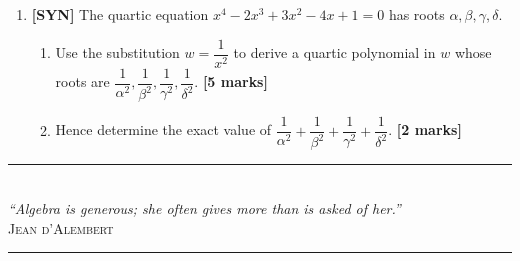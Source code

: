 \documentclass[11pt,a4paper]{article}
\begin{document}
\begin{enumerate}[resume]
\item \textbf{[SYN]} The quartic equation $x^4 - 2x^3 + 3x^2 - 4x + 1 = 0$ has roots $\alpha, \beta, \gamma, \delta$.
\begin{enumerate}[label=(\alph*)]
  \item Use the substitution $w = \dfrac{1}{x^2}$ to derive a quartic polynomial in $w$ whose roots are $\dfrac{1}{\alpha^2}, \dfrac{1}{\beta^2}, \dfrac{1}{\gamma^2}, \dfrac{1}{\delta^2}$. \hfill{\textbf{[5 marks]}}
  \item Hence determine the exact value of $\dfrac{1}{\alpha^2} + \dfrac{1}{\beta^2} + \dfrac{1}{\gamma^2} + \dfrac{1}{\delta^2}$. \hfill{\textbf{[2 marks]}}
\end{enumerate}

\end{enumerate}

\vspace{14pt}
\begin{center}
  {\color{accentline}\rule{0.4\textwidth}{0.4pt}}\\[5pt]
  {\footnotesize\itshape\color{medgray} ``Algebra is generous; she often gives more than is asked of her.''}\\[2pt]
  {\scriptsize\scshape\color{medgray} Jean d'Alembert}\\[5pt]
  {\color{accentline}\rule{0.4\textwidth}{0.4pt}}
\end{center}
\end{document}
